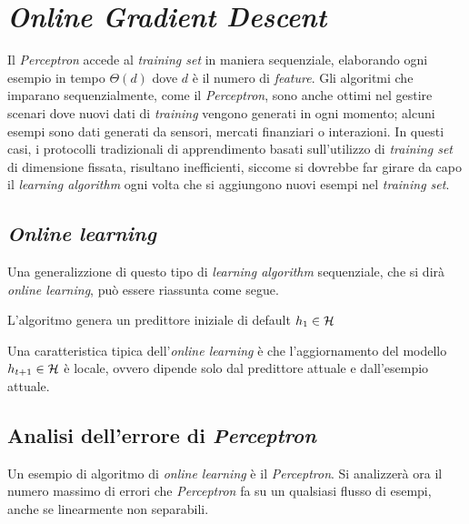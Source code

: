 \section{\textit{Online Gradient Descent}}

Il \textit{Perceptron} accede al \textit{training set} in maniera sequenziale,
elaborando ogni esempio in tempo $\Theta(d)$ dove $d$ è il numero di 
\textit{feature}. Gli algoritmi che imparano sequenzialmente, come il
\textit{Perceptron}, sono anche ottimi nel gestire scenari dove nuovi dati di
\textit{training} vengono generati in ogni momento; alcuni esempi sono dati
generati da sensori, mercati finanziari o interazioni. In questi casi, i
protocolli tradizionali di apprendimento basati sull'utilizzo di
\textit{training set} di dimensione fissata, risultano inefficienti, siccome
si dovrebbe far girare da capo il \textit{learning algorithm} ogni volta che
si aggiungono nuovi esempi nel \textit{training set}.

\subsection{\textit{Online learning}}
Una generalizzione di questo tipo di \textit{learning algorithm} sequenziale,
che si dirà \textit{online learning}, può essere riassunta come segue.
\begin{algorithm}
    \DontPrintSemicolon
    \;
    L'algoritmo genera un predittore iniziale di default $h_1\in\mathcal{H}$\;
\end{algorithm}
\vspace{-1.5em}

Una caratteristica tipica dell'\textit{online learning} è che l'aggiornamento
del modello $h_{t+1}\in\mathcal{H}$ è locale, ovvero dipende solo dal predittore
attuale e dall'esempio attuale.

\subsection{Analisi dell'errore di \textit{Perceptron}}
Un esempio di algoritmo di \textit{online learning} è il \textit{Perceptron}.
Si analizzerà ora il numero massimo di errori che \textit{Perceptron} fa su
un qualsiasi flusso di esempi, anche se linearmente non separabili.

